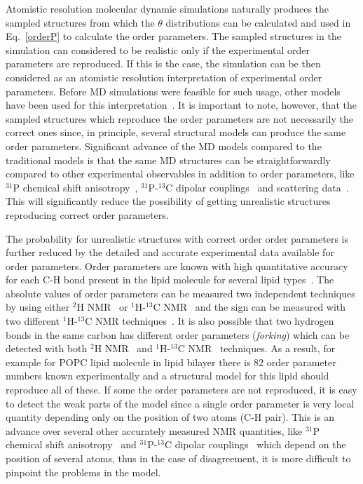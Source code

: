 \documentclass[aps,prl,superscriptaddress,twocolumn]{revtex4}
\begin{document}
Atomistic resolution molecular dynamic simulations naturally produces the
sampled structures from which the $\theta$ distributions can be calculated and
used in Eq.~\ref{orderP} to calculate the order parameters.
The sampled structures in the simulation can considered to be realistic
only if the experimental order parameters are reproduced.
If this is the case, the simulation can be then considered 
as an atomistic resolution interpretation of experimental order parameters.
Before MD simulations were feasible for such usage, other models have been used for this interpretation~\cite{seelig74,gally75,seelig77,seelig78,strenk85,baenziger91,hong95b,bruzik97}.
It is important to note, however, that the sampled structures which reproduce the order parameters are not 
necessarily the correct ones since, in principle, several structural models can produce the same order parameters. 
Significant advance of the MD models compared to the traditional models is that the same MD 
structures can be straightforwardly compared to other experimental observables in addition to order parameters, 
like $^{31}$P chemical shift anisotropy~\cite{chowdhary13}, $^{31}$P-$^{13}$C dipolar couplings~\cite{prakash10}
and scattering data~\cite{??}. This will significantly reduce the 
possibility of getting unrealistic structures reproducing correct order parameters.

The probability for unrealistic structures with correct order order parameters is further reduced by
the detailed and accurate experimental data available for order parameters.
Order parameters are known with high quantitative accuracy for each C-H bond present in the lipid molecule
for several lipid types~\cite{leftin11,marsh13,dvinskikh05a,ferreira13,leftin13,leftin14,botan15}. 
The absolute values of order parameters can be measured two independent
techniques by using either $^2$H NMR~\cite{seelig77c,jacobs81,davis83} or $^1$H-$^{13}$C NMR~\cite{hong95a,gross97,dvinskikh05a,ferreira13} and
the sign can be measured with two different $^1$H-$^{13}$C NMR techniques~\cite{hong95a,hong95b,gross97}.
It is also possible that two hydrogen bonds in the same carbon has different order parameters ({\it forking})
which can be detected with both $^2$H NMR~\cite{seelig75,gally81,engel81} and $^1$H-$^{13}$C NMR~\cite{gross97,dvinskikh05a,ferreira13} techniques.
As a result, for example for POPC lipid molecule in lipid bilayer there is 82 order parameter numbers
known experimentally and a structural model for this lipid should reproduce all of these.
If some the order parameters are not reproduced, it is easy to detect the weak parts of the model
since a single order parameter is very local quantity depending only on the position of two atoms (C-H pair).
This is an advance over several other accurately measured NMR quantities, 
like $^{31}$P chemical shift anisotropy~\cite{chowdhary13} and $^{31}$P-$^{13}$C dipolar couplings~\cite{prakash10}
which depend on the position of several atoms, thus in the case of disagreement, it is more difficult 
to pinpoint the problems in the model.
\end{document}
